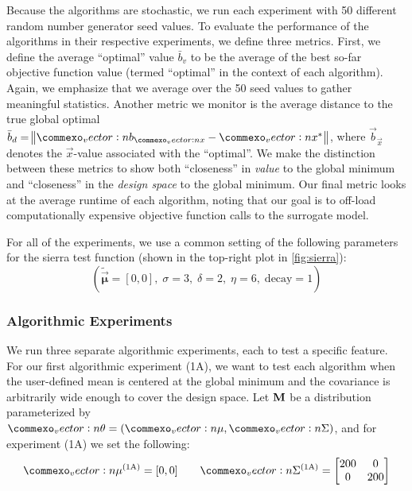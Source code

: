Because the algorithms are stochastic, we run each experiment with 50 different random number generator seed values.
To evaluate the performance of the algorithms in their respective experiments, we define three metrics.
First, we define the average ``optimal'' value $\bar{b}_v$ to be the average of the best so-far objective function value (termed ``optimal'' in the context of each algorithm). Again, we emphasize that we average over the 50 seed values to gather meaningful statistics.
Another metric we monitor is the average distance to the true global optimal $\bar{b}_d = \norm{\vec{b}_{\vec{x}} - \vec{x}^*}$, where $\vec{b}_{\vec{x}}$ denotes the $\vec{x}$-value associated with the ``optimal''.
We make the distinction between these metrics to show both ``closeness'' in \textit{value} to the global minimum and ``closeness'' in the \textit{design space} to the global minimum.
Our final metric looks at the average runtime of each algorithm, noting that our goal is to off-load computationally expensive objective function calls to the surrogate model.

For all of the experiments, we use a common setting of the following parameters for the sierra test function (shown in the top-right plot in \cref{fig:sierra}):
\begin{equation*}
    (\mathbf{\tilde{\vec{\mu}}} =[0,0],\; \sigma=3,\; \delta=2,\; \eta=6,\; \text{decay} = 1)
\end{equation*}


\subsubsection{Algorithmic Experiments} \label{sec:cem_alg_experiments}
We run three separate algorithmic experiments, each to test a specific feature.
For our first algorithmic experiment (1A), we want to test each algorithm when the user-defined mean is centered at the global minimum and the covariance is arbitrarily wide enough to cover the design space.
Let $\mathbf{M}$ be a distribution parameterized by $\vec{\theta} = (\vec{\mu}, \mat{\Sigma})$, and for experiment (1A) we set the following:
\begin{equation*}
    \vec\mu^{(\text{1A})} = [0, 0] \qquad
    \mat\Sigma^{(\text{1A})} = \begin{bmatrix}
        200 & 0\\
        0 & 200
    \end{bmatrix}
\end{equation*}

